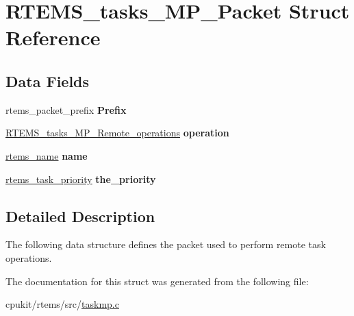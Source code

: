 \hypertarget{structRTEMS__tasks__MP__Packet}{}\section{R\+T\+E\+M\+S\+\_\+tasks\+\_\+\+M\+P\+\_\+\+Packet Struct Reference}
\label{structRTEMS__tasks__MP__Packet}
\subsection*{Data Fields}
\begin{DoxyCompactItemize}
\item 
\mbox{\label{structRTEMS__tasks__MP__Packet_ab86f3adb445da168a755b171fa60c514}} 
rtems\+\_\+packet\+\_\+prefix {\bfseries Prefix}
\item 
\mbox{\label{structRTEMS__tasks__MP__Packet_aa58d11920576fc99cecf7061b2be5c8e}} 
\mbox{\hyperlink{group__ClassicTaskMP_ga8898253dbfcff93eb97b8646eefd1fa3}{R\+T\+E\+M\+S\+\_\+tasks\+\_\+\+M\+P\+\_\+\+Remote\+\_\+operations}} {\bfseries operation}
\item 
\mbox{\label{structRTEMS__tasks__MP__Packet_a0345e891d8be6fdf33d0f69471311f24}} 
\mbox{\hyperlink{group__ClassicTasks_ga55fb63c49f68c0cbd9bee004da15b1fd}{rtems\+\_\+name}} {\bfseries name}
\item 
\mbox{\label{structRTEMS__tasks__MP__Packet_a67b87a658db06124cf25ebdb79763deb}} 
\mbox{\hyperlink{group__ClassicTasks_gaa80a0c0938307d1e99d0eb5fee765b47}{rtems\+\_\+task\+\_\+priority}} {\bfseries the\+\_\+priority}
\end{DoxyCompactItemize}


\subsection{Detailed Description}
The following data structure defines the packet used to perform remote task operations. 

The documentation for this struct was generated from the following file\+:\begin{DoxyCompactItemize}
\item 
cpukit/rtems/src/\mbox{\hyperlink{taskmp_8c}{taskmp.\+c}}\end{DoxyCompactItemize}
